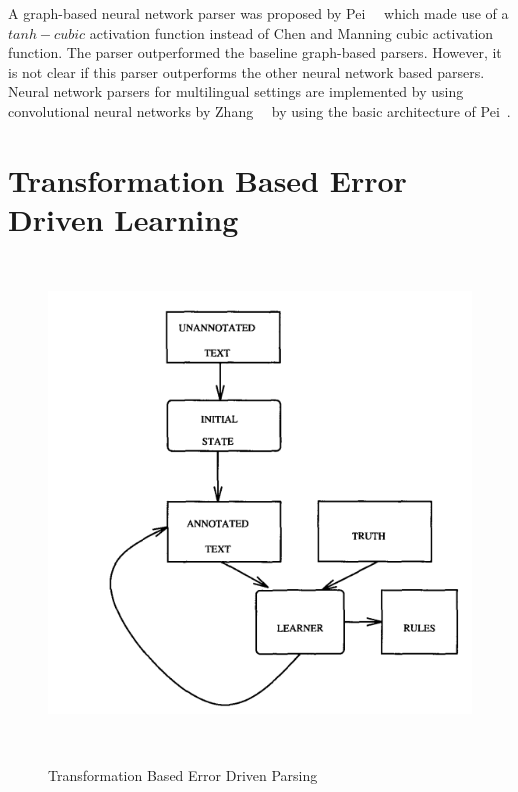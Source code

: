 A graph-based neural network parser was proposed by Pei~\etal~\cite{pei2015effective} which made use of a $tanh-cubic$ activation function instead of Chen and Manning cubic activation function. The parser outperformed the baseline graph-based parsers. However, it is not clear if this parser outperforms the other neural network based parsers. Neural network parsers for multilingual settings are implemented by using convolutional neural networks by Zhang~\etal~\cite{zhang2016probabilistic} by using the basic architecture of Pei~\etal.

\section{Transformation Based Error Driven Learning}~\label{sec:TBL}

\begin{figure}[t!]
\centering
    \includegraphics[scale=0.8]{tbl-brill.png}
\caption{Transformation Based Error Driven Parsing}~\citep{brill1992simple}
\label{tbl:brill}
\end{figure}

